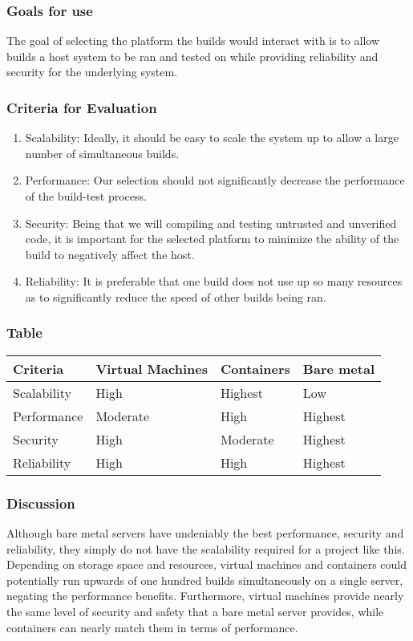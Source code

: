 \documentclass[10pt,letterpaper,onecolumn,draftclsnofoot]{IEEEtran}
\begin{document}
\subsubsection{Goals for use}
The goal of selecting the platform the builds would interact with is to allow builds a host system to be ran and tested on while providing reliability and security for the underlying system.
\subsubsection{Criteria for Evaluation}
\begin{enumerate}
  \item Scalability: Ideally, it should be easy to scale the system up to allow a large number of simultaneous builds.
  \item Performance: Our selection should not significantly decrease the performance of the build-test process.
  \item Security: Being that we will compiling and testing untrusted and unverified code, it is important for the selected platform to minimize the ability of the build to negatively affect the host.
  \item Reliability: It is preferable that one build does not use up so many resources as to significantly reduce the speed of other builds being ran.
\end{enumerate}
\subsubsection{Table}
\begin{center}
  \begin{tabular}{llll}
    Criteria & Virtual Machines & Containers & Bare metal \\ \midrule
    Scalability       & High & Highest & Low \\ \midrule
    Performance           & Moderate & High & Highest \\ \midrule
    Security       & High & Moderate & Highest \\ \midrule
    Reliability  & High & High & Highest \\ \bottomrule
  \end{tabular}
\end{center}
\subsubsection{Discussion}
Although bare metal servers have undeniably the best performance, security and reliability, they simply do not have the scalability required for a project like this. Depending on storage space and resources, virtual machines and containers could potentially run upwards of one hundred builds simultaneously on a single server, negating the performance benefits. Furthermore, virtual machines provide nearly the same level of security and safety that a bare metal server provides, while containers can nearly match them in terms of performance.
\end{document}
